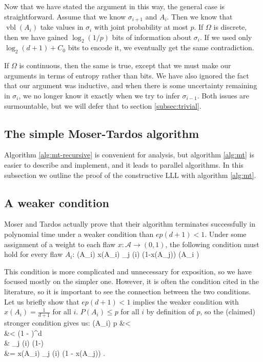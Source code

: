 \documentclass{article}
\def\seqn#1\eeqn{\begin{align}#1\end{align}}
\begin{document}
Now that we have stated the argument in this way, the general case is straightforward.  Assume that we know $\sigma_{i+1}$ and $A_i$.  Then we know that $\operatorname{vbl}(A_i)$ take values in $\sigma_i$ with joint probability at most $p$.  If $\Omega$ is discrete, then we have gained $\log_2 (1/p)$ bits of information about $\sigma_i$.  If we used only $\log_2 (d+1) + C_0$ bits to encode it, we eventually get the same contradiction.

If $\Omega$ is continuous, then the same is true, except that we must make our arguments in terms of entropy rather than bits.  We have also ignored the fact that our argument was inductive, and when there is some uncertainty remaining in $\sigma_{i}$, we no longer know it exactly when we try to infer $\sigma_{i-1}$.  Both issues are surmountable, but we will defer that to section \ref{subsec:trivial}.

\subsection{The simple Moser-Tardos algorithm}
Algorithm \ref{alg:mt-recursive} is convenient for analysis, but algorithm \ref{alg:mt} is easier to describe and implement, and it leads to parallel algorithms.  In this subsection we outline the proof of the constructive LLL with algorithm \ref{alg:mt}.

\subsection{A weaker condition}
Moser and Tardos actually prove that their algorithm terminates successfully in polynomial time under a weaker condition than $e p (d+1) < 1$.  Under some assignment of a weight to each flaw $x: \mathcal{A} \to (0,1)$, the following condition must hold for every flaw $A_i$:
\seqn
  P(A_i) \leq x(A_i) \prod_{j \in \Gamma(i)} (1-x(A_j)) (\forall A_i \in {}) \label{eqn:general-lll-req}
\eeqn

This condition is more complicated and unnecessary for exposition, so we have  focused mostly on the simpler one.  However, it is often the condition cited in the literature, so it is important to see the connection between the two conditions.  Let us briefly show that $e p (d+1) < 1$ implies the weaker condition with $x(A_i) = \frac{1}{d+1}$ for all $i$.  $P(A_i) \leq p$ for all $i$ by definition of $p$, so the (claimed) stronger condition gives us:
\seqn
  P(A_i) \leq p &<    \\
  &<  (1 - )^d \\
  &\leq {} \prod_{j \in \Gamma(i)} (1-) \\
  &= x(A_i) \prod_{j \in \Gamma(i)} (1 - x(A_j)) .
\eeqn
\end{document}
